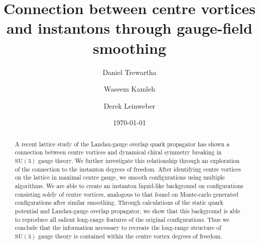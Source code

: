 \documentclass[
 reprint,
 amsmath,amssymb,
 aps,
prd,
]{revtex4-1}
\begin{document}
\newcommand{\trace}{\mathrm{Tr}}
\newcommand{\identity}{{\bf I}}
\newcommand{\SU}[1]{\mathrm{SU}(#1)}
\newlength{\RvQwidth}
\setlength{\RvQwidth}{0.65\columnwidth}

\newcommand{\UM}{{\bf U}}
\newcommand{\VM}{{\bf V}}
\newcommand{\UMC}{{\bf U}^{*}}
\newcommand{\VMC}{{\bf V}^{*}}
\newcommand{\US}{\mathrm{u}}
\newcommand{\VS}{\mathrm{v}}
\newcommand{\USC}{\mathrm{u}^{*}}
\newcommand{\VSC}{\mathrm{v}^{*}}

\makeatletter
\preto{}
\appto{}
\makeatother

\title{Connection between centre vortices and instantons through gauge-field smoothing}

\author{Daniel Trewartha}
\author{Waseem Kamleh}
\author{Derek Leinweber}



\date{\today}

\begin{abstract}
A recent lattice study of the Landau-gauge overlap quark propagator has shown a connection between centre vortices and dynamical chiral symmetry breaking in $\SU{3}$ gauge theory. We further investigate this relationship through an exploration of the connection to the instanton degrees of freedom. After identifying centre vortices on the lattice in maximal centre gauge, we smooth configurations using multiple algorithms. We are able to create an instanton liquid-like background on configurations consisting solely of centre vortices, analogous to that found on Monte-carlo generated configurations after similar smoothing. Through calculations of the static quark potential and Landau-gauge overlap propagator, we show that this background is able to reproduce all salient long-range features of the original configurations. Thus we conclude that the information necessary to recreate the long-range structure of $\SU{3}$ gauge theory is contained within the centre vortex degrees of freedom.
\end{abstract}
\end{document}
